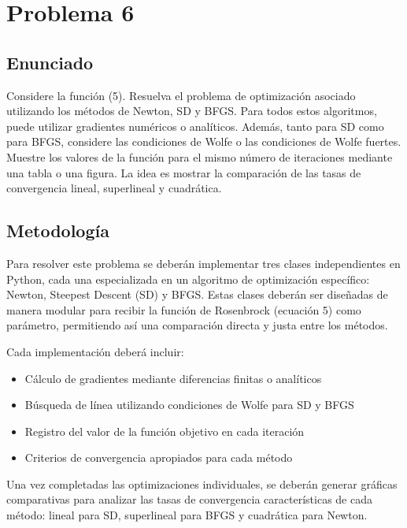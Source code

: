 \documentclass{article}
\begin{document}
\section{Problema 6}

\subsection{Enunciado}

Considere la función (5). Resuelva el problema de optimización asociado utilizando los métodos de Newton, SD y BFGS. Para todos estos algoritmos, puede utilizar gradientes numéricos o analíticos. Además, tanto para SD como para BFGS, considere las condiciones de Wolfe o las condiciones de Wolfe fuertes. Muestre los valores de la función para el mismo número de iteraciones mediante una tabla o una figura. La idea es mostrar la comparación de las tasas de convergencia lineal, superlineal y cuadrática.

\subsection{Metodología}

Para resolver este problema se deberán implementar tres clases independientes en Python, cada una especializada en un algoritmo de optimización específico: Newton, Steepest Descent (SD) y BFGS. Estas clases deberán ser diseñadas de manera modular para recibir la función de Rosenbrock (ecuación 5) como parámetro, permitiendo así una comparación directa y justa entre los métodos.

Cada implementación deberá incluir:
\begin{itemize}
    \item Cálculo de gradientes mediante diferencias finitas o analíticos
    \item Búsqueda de línea utilizando condiciones de Wolfe para SD y BFGS
    \item Registro del valor de la función objetivo en cada iteración
    \item Criterios de convergencia apropiados para cada método
\end{itemize}

Una vez completadas las optimizaciones individuales, se deberán generar gráficas comparativas para analizar las tasas de convergencia características de cada método: lineal para SD, superlineal para BFGS y cuadrática para Newton.
\end{document}
